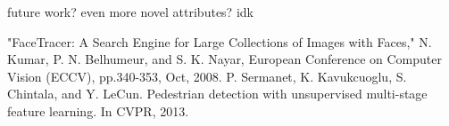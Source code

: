 \documentclass[letterpaper,10pt, twocolumn]{article}
\begin{document}
future work? even more novel attributes? idk





\begin{thebibliography}{9}
	"FaceTracer: A Search Engine for Large Collections of Images with Faces," 
	N. Kumar, P. N. Belhumeur, and S. K. Nayar, 
	European Conference on Computer Vision (ECCV), 
	pp.340-353, Oct, 2008.
	P. Sermanet, K. Kavukcuoglu, S. Chintala, and Y. LeCun. Pedestrian
	detection with unsupervised multi-stage feature learning. In CVPR,
	2013.


\end{thebibliography}
\end{document}
